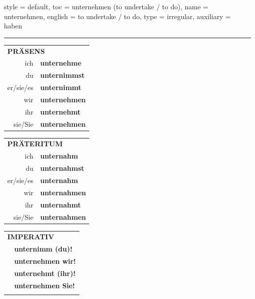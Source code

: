 \begin{verbentry}{
  style = {default},
  toc = {unternehmen (to undertake / to do)},
  name = {unternehmen},
  english = {to undertake / to do},
  type = {irregular},
  auxiliary = {haben}
}
 
    
     \vspace{5pt}

    \hrule
    
    \vspace{5pt}

  \begin{tabular}{rl}
     \multicolumn{2}{l}{\textbf{PRÄSENS} }\\
    ich & \textbf{unternehme}\\
    du & \textbf{unternimmst}\\
    er/sie/es & \textbf{unternimmt}\\
    wir & \textbf{unternehmen}\\
    ihr & \textbf{unternehmt}\\
    sie/Sie & \textbf{unternehmen}\\
  \end{tabular}
  \hfill
     \begin{tabular}{rl}
    \multicolumn{2}{l}{\textbf{PRÄTERITUM} }\\
    ich & \textbf{unternahm}\\
    du & \textbf{unternahmst}\\
    er/sie/es & \textbf{unternahm}\\
    wir & \textbf{unternahmen}\\
    ihr & \textbf{unternahmt}\\
    sie/Sie & \textbf{unternahmen}\\
  \end{tabular}
  \hfill
  \begin{tabular}{rl}
     \multicolumn{2}{l}{\textbf{IMPERATIV} }\\
   & \textbf{unternimm (du)!}\\
   & \textbf{unternehmen wir!}\\
   & \textbf{unternehmt (ihr)!}\\
   & \textbf{unternehmen Sie!}\\
   & \vspace{10pt}
  \end{tabular}

    \vspace{10pt}


\end{verbentry}
